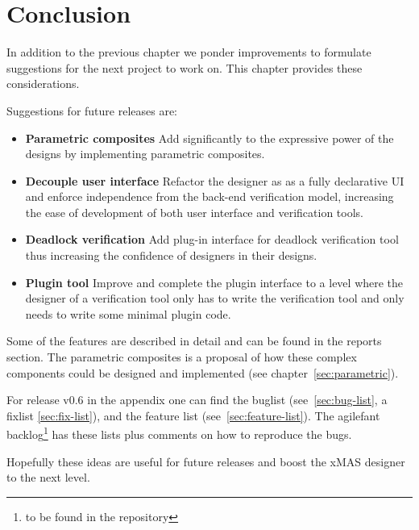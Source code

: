 \chapter{Conclusion}

In addition to the previous chapter we ponder improvements to formulate 
suggestions for the next project to work on. This chapter provides these considerations.

Suggestions for future releases are:
\begin{itemize}
\item \textbf{Parametric composites} Add significantly to the expressive power
of the \Noc designs by implementing parametric composites.
\item \textbf{Decouple user interface} Refactor the designer as 
as a fully declarative UI and enforce independence from the back-end 
verification model, increasing the ease of development of both user interface
and verification tools.
\item \textbf{Deadlock verification} Add plug-in interface for deadlock verification tool
thus increasing the confidence of designers in their \Noc designs.
\item \textbf{Plugin tool} Improve and complete the plugin interface to a level where
the designer of a verification tool only has to write the verification tool and 
only needs to write some minimal plugin code. 
\end{itemize}

Some of the features are described in detail and can be found in the
reports section. The parametric composites is a proposal of how these
complex components could be designed and implemented (see chapter~\ref{sec:parametric}).

For release v0.6 in the appendix one can find the buglist (see~\ref{sec:bug-list}, a fixlist \ref{sec:fix-list}), 
and the feature list (see~\ref{sec:feature-list}).
The agilefant backlog\footnote{to be found in the repository} has these lists plus 
comments on how to reproduce the bugs.

Hopefully these ideas are useful for future releases and boost the xMAS designer
to the next level.
